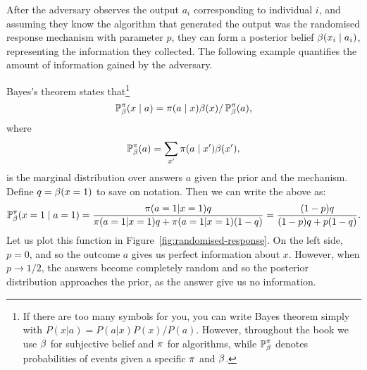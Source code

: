 \begin{frame}
{    After the adversary observes the output $a_i$ corresponding to
    individual $i$, and assuming they know the algorithm that
    generated the output was the randomised response mechanism with
    parameter $p$, they can form a posterior belief
    $\beta(x_i \mid a_i)$, representing the information they
    collected. The following example quantifies the amount of
    information gained by the adversary.  }
  \begin{example}
    Bayes's theorem states that\footnote{If there are too many symbols for you, you can write Bayes theorem simply with $P(x | a) = P(a | x) P(x) / P(a)$. However, throughout the book we use $\beta$ for subjective belief and $\pi$ for algorithms, while $\mathop{\mbox{\ensuremath{\mathbb{P}}}}\nolimits_\beta^\pi$ denotes probabilities of events given a specific $\pi$ and $\beta$.}
    \[
      \mathop{\mbox{\ensuremath{\mathbb{P}}}}\nolimits^\pi_\beta(x \mid a) = \pi(a \mid x) \beta(x) / \mathop{\mbox{\ensuremath{\mathbb{P}}}}\nolimits^\pi_\beta(a),
    \]
    where
    \[
      \mathop{\mbox{\ensuremath{\mathbb{P}}}}\nolimits^\pi_\beta(a) = \sum_{x'} \pi(a \mid x') \beta(x'),
    \]
    is the marginal distribution over answers $a$ given the prior and the mechanism.
    Define $q = \beta(x = 1)$ to save on notation. Then we can write the above as:
    \[
      \mathop{\mbox{\ensuremath{\mathbb{P}}}}\nolimits^\pi_\beta(x = 1 \mid a = 1) =
      \frac{\pi(a = 1 | x = 1) q}
      {\pi(a = 1 | x = 1) q + \pi(a = 1 | x = 1) (1 - q)}
      =
      \frac{(1 - p) q}{(1 - p)q + p(1 - q)}.
    \]
    Let us plot this function in Figure~\ref{fig:randomised-response}. On the left side, $p = 0$, and so the outcome $a$ gives us perfect information about $x$. However, when $p \to 1/2$, the answers become completely random and so the posterior distribution approaches the prior, as the answer give us no information.
    \begin{figure}[h]
      \centering
\end{figure}
\end{example}
\end{frame}
